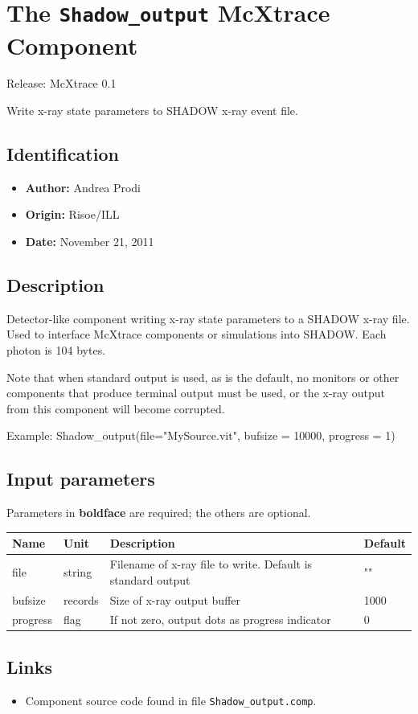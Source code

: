 \section{The \texttt{Shadow\_output} McXtrace Component}
Release: McXtrace 0.1

Write x-ray state parameters to SHADOW x-ray event file.

\subsection*{Identification}
\begin{itemize}
  \item \textbf{Author:} Andrea Prodi
  \item \textbf{Origin:} Risoe/ILL
  \item \textbf{Date:} November 21, 2011
\end{itemize}

\subsection*{Description}
Detector-like component writing x-ray state parameters to a SHADOW x-ray file. Used to interface McXtrace components or simulations into SHADOW. Each photon is 104 bytes.

Note that when standard output is used, as is the default, no monitors or other components that produce terminal output must be used, or the x-ray output from this component will become corrupted.

Example: Shadow\_output(file="MySource.vit", bufsize = 10000, progress = 1)

\subsection*{Input parameters}
Parameters in \textbf{boldface} are required; the others are optional.

\begin{longtable}{p{}p{}p{}p{}}
\toprule
\textbf{Name} & \textbf{Unit} & \textbf{Description} & \textbf{Default} \\
\midrule
\endhead
file & string & Filename of x-ray file to write. Default is standard output & "" \\
bufsize & records & Size of x-ray output buffer & 1000 \\
progress & flag & If not zero, output dots as progress indicator & 0 \\
\bottomrule
\end{longtable}

\subsection*{Links}
\begin{itemize}
  \item Component source code found in file \texttt{Shadow\_output.comp}.
\end{itemize}
